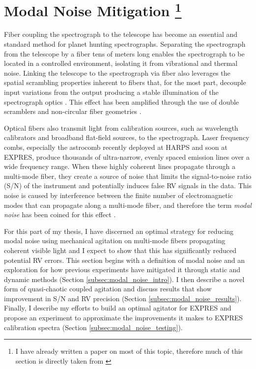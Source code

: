 \documentclass[11pt]{article}
\begin{document}
\section{Modal Noise Mitigation \footnote{I have already written a paper on most of this topic, therefore much of this section is directly taken from \citet{Petersburg2018}}}
\label{sec:modal_noise}

Fiber coupling the spectrograph to the telescope has become an essential and standard method for planet hunting spectrographs. Separating the spectrograph from the telescope by a fiber tens of meters long enables the spectrograph to be located in a controlled environment, isolating it from vibrational and thermal noise. Linking the telescope to the spectrograph via fiber also leverages the spatial scrambling properties inherent to fibers that, for the most part, decouple input variations from the output producing a stable illumination of the spectrograph optics \citep{Hunter1992}. This effect has been amplified through the use of double scramblers \citep{Halverson2015a, Spronck2015} and non-circular fiber geometries \citep{Chazelas2010, Spronck2012, Plavchan2013}.

Optical fibers also transmit light from calibration sources, such as wavelength calibrators and broadband flat-field sources, to the spectrograph. Laser frequency combs, especially the  astrocomb \citep{Probst2014} recently deployed at HARPS and soon at EXPRES, produce thousands of ultra-narrow, evenly spaced emission lines over a wide frequency range. When these highly coherent lines propagate through a multi-mode fiber, they create a source of noise that limits the signal-to-noise ratio (S/N) of the instrument and potentially induces false RV signals in the data. This noise is caused by interference between the finite number of electromagnetic modes that can propagate along a multi-mode fiber, and therefore the term \textit{modal noise} has been coined for this effect \citep{Epworth1978}.

For this part of my thesis, I have discerned an optimal strategy for reducing modal noise using mechanical agitation on multi-mode fibers propagating coherent visible light and I expect to show that this has significantly reduced potential RV errors. This section begins with a definition of modal noise and an exploration for how previous experiments have mitigated it through static and dynamic methods (Section \ref{subsec:modal_noise_intro}). I then describe a novel form of quasi-chaotic coupled agitation and discuss results that show improvement in S/N and RV precision (Section \ref{subsec:modal_noise_results}). Finally, I describe my efforts to build an optimal agitator for EXPRES and propose an experiment to approximate the improvements it makes to EXPRES calibration spectra (Section \ref{subsec:modal_noise_testing}).
\end{document}
